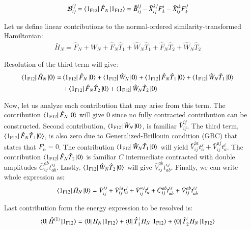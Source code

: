 \documentclass[journal=jacsat]{achemso}
\numberwithin{equation}{section}
\begin{document}
\begin{align}
\mathcal{B}^{ij}_{ij}=\bra{1_{\text{F12}}}\hat{F}_{N}\ket{1_{\text{F12}}}
=\bar{B}^{ij}_{ij}-\bar{X}^{kj}_{ij}F^{i}_{k}-\bar{X}^{ik}_{ij}F^{j}_{k}
\end{align}  

Let us define linear contributions to the normal-ordered similarity-transformed Hamiltonian:
\begin{align}
\bar{H}_{N}=\hat{F}_{N}+\hat{W}_{N}+\hat{F}_{N}\hat{T}_{1}+\hat{W}_{N}\hat{T}_{1}+\hat{F}_{N}\hat{T}_{2}+\hat{W}_{N}\hat{T}_{2}
\end{align}  

Resolution of the third term will give:
\begin{align}
\bra{1_{\text{F12}}}\bar{H}_{N}\ket{0}
=&\bra{1_{\text{F12}}}\hat{F}_{N}\ket{0}+\bra{1_{\text{F12}}}\hat{W}_{N}\ket{0}+\bra{1_{\text{F12}}}\hat{F}_{N}\hat{T}_{1}\ket{0}+\bra{1_{\text{F12}}}\hat{W}_{N}\hat{T}_{1}\ket{0}\\\nonumber
&+\bra{1_{\text{F12}}}\hat{F}_{N}\hat{T}_{2}\ket{0}+\bra{1_{\text{F12}}}\hat{W}_{N}\hat{T}_{2}\ket{0}
\end{align}  

Now, let us analyze each contribution that may arise from this term. The contribution $\bra{1_{\text{F12}}}\hat{F}_{N}\ket{0}$ will give 0 since no fully contracted contribution can be constructed. Second contribution, $\bra{1_{\text{F12}}}\hat{W}_{N}\ket{0}$, is familiar $\bar{V}^{ij}_{ij}$. The third term, $\bra{1_{\text{F12}}}\hat{F}_{N}\hat{T}_{1}\ket{0}$, is also zero due to Generalized-Brillouin condition (GBC) that states that $F^{i}_{\alpha}=0$. The contribution  $\bra{1_{\text{F12}}}\hat{W}_{N}\hat{T}_{1}\ket{0}$ will yield $\bar{V}^{ia}_{ij}t^{j}_{a}+\bar{V}^{aj}_{ij}t^{i}_{a}$. The contribution $\bra{1_{\text{F12}}}\hat{F}_{N}\hat{T}_{2}\ket{0}$ is familiar $C$ intermediate contracted with double amplitudes $\bar{C}^{ab}_{ij}t^{ij}_{ab}$. Lastly, $\bra{1_{\text{F12}}}\hat{W}_{N}\hat{T}_{2}\ket{0}$ will give $\bar{V}^{ab}_{ij}t^{ij}_{ab}$. Finally, we can write whole expression as:
\begin{align}
\bra{1_{\text{F12}}}\bar{H}_{N}\ket{0}
=\bar{V}^{ij}_{ij}+\bar{V}^{ia}_{ij}t^{j}_{a}+\bar{V}^{aj}_{ij}t^{i}_{a}+\bar{C}^{ab}_{ij}t^{ij}_{ab}+\bar{V}^{ab}_{ij}t^{ij}_{ab}
\end{align}  

Last contribution form the energy expression to be resolved is:
\begin{align}
\bra{0}\hat{H}^{(1)}\ket{1_{\text{F12}}}=\bra{0}\bar{H}_{N}\ket{1_{\text{F12}}}+\bra{0}\hat{T}_{1}^{\dagger}\bar{H}_{N}\ket{1_{\text{F12}}}+\bra{0}\hat{T}_{2}^{\dagger}\bar{H}_{N}\ket{1_{\text{F12}}}
\end{align}   
\end{document}
